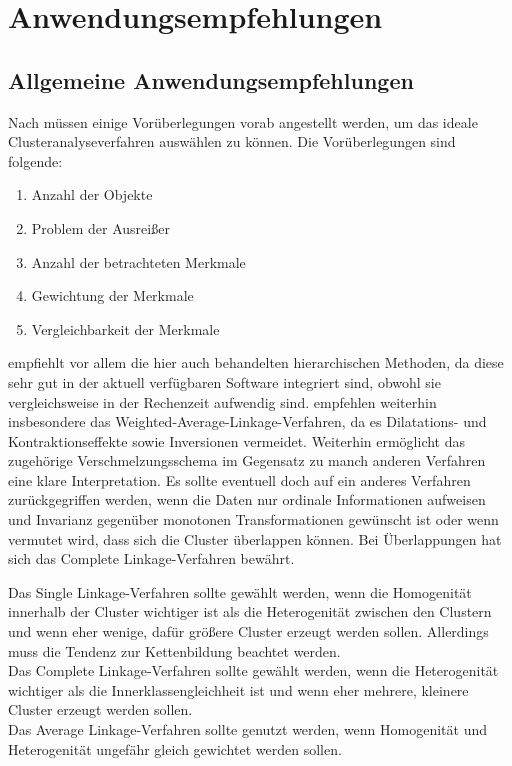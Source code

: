 \chapter{Anwendungsempfehlungen}

\section{Allgemeine Anwendungsempfehlungen}

Nach \citet[S. 510]{Backhaus.2016} müssen einige Vorüberlegungen vorab angestellt werden, um das ideale Clusteranalyseverfahren auswählen zu können. Die Vorüberlegungen sind folgende:
\begin{enumerate}
    \item Anzahl der Objekte
    \item Problem der Ausreißer
    \item Anzahl der betrachteten Merkmale
    \item Gewichtung der Merkmale
    \item Vergleichbarkeit der Merkmale
\end{enumerate}

\citet[S. 110]{Everitt.2011} empfiehlt vor allem die hier auch behandelten hierarchischen Methoden, da diese sehr gut in der aktuell verfügbaren Software integriert sind, obwohl sie vergleichsweise in der Rechenzeit aufwendig sind. \citet[S. 275]{Bacher.2010} empfehlen weiterhin insbesondere das Weighted-Average-Linkage-Verfahren, da es Dilatations- und Kontraktionseffekte sowie Inversionen vermeidet. Weiterhin ermöglicht das zugehörige Verschmelzungsschema im Gegensatz zu manch anderen Verfahren eine klare Interpretation. Es sollte eventuell doch auf ein anderes Verfahren zurückgegriffen werden, wenn die Daten nur ordinale Informationen aufweisen und Invarianz gegenüber monotonen Transformationen gewünscht ist oder wenn vermutet wird, dass sich die Cluster überlappen können. Bei Überlappungen hat sich das Complete Linkage-Verfahren bewährt.

Das Single Linkage-Verfahren sollte gewählt werden, wenn die Homogenität innerhalb der Cluster wichtiger ist als die Heterogenität zwischen den Clustern und wenn eher wenige, dafür größere Cluster erzeugt werden sollen. Allerdings muss die Tendenz zur Kettenbildung beachtet werden. \\
Das Complete Linkage-Verfahren sollte gewählt werden, wenn die Heterogenität wichtiger als die Innerklassengleichheit ist und wenn eher mehrere, kleinere Cluster erzeugt werden sollen. \\
Das Average Linkage-Verfahren sollte genutzt werden, wenn Homogenität und Heterogenität ungefähr gleich gewichtet werden sollen.

